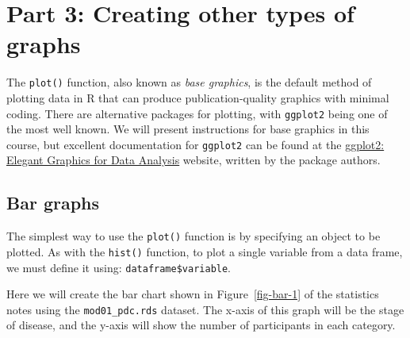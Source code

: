 \documentclass[
  a4paper,
]{memoir}
\newenvironment{Shaded}{\begin{snugshade}}{\end{snugshade}}
\newcommand{\AttributeTok}[1]{\textcolor[rgb]{0.00,0.00,0.00}{#1}}
\newcommand{\FunctionTok}[1]{\textcolor[rgb]{0.00,0.00,0.00}{#1}}
\newcommand{\NormalTok}[1]{\textcolor[rgb]{0.00,0.00,0.00}{#1}}
\newcommand{\SpecialCharTok}[1]{\textcolor[rgb]{0.00,0.00,0.00}{#1}}
\newcommand{\StringTok}[1]{\textcolor[rgb]{0.00,0.00,0.00}{#1}}
\begin{document}
\hypertarget{part-3-creating-other-types-of-graphs-1}{%
\section{Part 3: Creating other types of
graphs}\label{part-3-creating-other-types-of-graphs-1}}

The \texttt{plot()} function, also known as \emph{base graphics}, is the
default method of plotting data in R that can produce
publication-quality graphics with minimal coding. There are alternative
packages for plotting, with \texttt{ggplot2} being one of the most well
known. We will present instructions for base graphics in this course,
but excellent documentation for \texttt{ggplot2} can be found at the
\href{https://ggplot2-book.org/}{ggplot2: Elegant Graphics for Data
Analysis} website, written by the package authors.

\hypertarget{bar-graphs-1}{%
\subsection{Bar graphs}\label{bar-graphs-1}}

The simplest way to use the \texttt{plot()} function is by specifying an
object to be plotted. As with the \texttt{hist()} function, to plot a
single variable from a data frame, we must define it using:
\texttt{dataframe\$variable}.

Here we will create the bar chart shown in Figure~\ref{fig-bar-1} of the
statistics notes using the \texttt{mod01\_pdc.rds} dataset. The x-axis
of this graph will be the stage of disease, and the y-axis will show the
number of participants in each category.

\begin{Shaded}
\end{Shaded}
\end{document}

